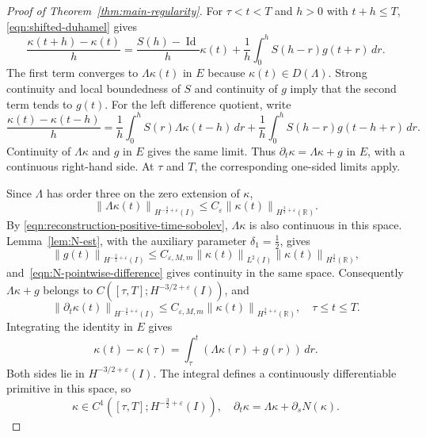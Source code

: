 \documentclass[11pt,reqno]{amsart}
\theoremstyle{plain}
\theoremstyle{definition}
\numberwithin{equation}{section}
\DeclareMathOperator{\Id}{Id}
\newcommand{\paren}[1]{\left(#1\right)}
\newcommand{\p}{\partial}
\newcommand{\norm}[1]{\left\lVert #1 \right\rVert}
\newcommand{\R}{\mathbb{R}}
\newcommand{\hi}[1]{H^{#1}(I)}
\newcommand{\hr}[1]{H^{#1}(\R)}
\begin{document}
\begin{proof}[Proof of Theorem~\ref{thm:main-regularity}]
For $\tau<t<T$ and $h>0$ with $t+h\le T$, \eqref{eqn:shifted-duhamel} gives
\begin{equation}\label{eqn:kappa-time-right-quotient}
    \frac{\kappa(t+h)-\kappa(t)}{h}
    =
    \frac{S(h)-\Id}{h}\kappa(t)
    +\frac1h\int_0^h S(h-r)g(t+r)\,dr.
\end{equation}
The first term converges to $\Lambda\kappa(t)$ in $E$ because
$\kappa(t)\in D(\Lambda)$. Strong continuity and local boundedness of
$S$ and continuity of $g$ imply that the second term tends to $g(t)$.
For the left difference quotient, write
\begin{equation}\label{eqn:kappa-time-left-quotient}
    \frac{\kappa(t)-\kappa(t-h)}{h}
    =
    \frac1h\int_0^h S(r)\Lambda\kappa(t-h)\,dr
    +\frac1h\int_0^h S(h-r)g(t-h+r)\,dr.
\end{equation}
Continuity of $\Lambda\kappa$ and $g$ in $E$ gives the same limit.
Thus $\p_t\kappa=\Lambda\kappa+g$ in $E$, with a continuous right-hand
side. At $\tau$ and $T$, the corresponding one-sided limits apply.

Since $\Lambda$ has order three on the zero extension of $\kappa$,
\begin{equation*}
    \norm{\Lambda\kappa(t)}_{\hi{-\frac32+\varepsilon}}
    \le C_\varepsilon
        \norm{\kappa(t)}_{\hr{\frac32+\varepsilon}}.
\end{equation*}
By \eqref{eqn:reconstruction-positive-time-sobolev}, $\Lambda\kappa$ is
also continuous in this space. Lemma~\ref{lem:N-est}, with
the auxiliary parameter $\delta_1=\frac12$, gives
\begin{equation*}
    \norm{g(t)}_{\hi{-\frac32+\varepsilon}}
    \le C_{\varepsilon,M,m}\norm{\kappa(t)}_{L^2(I)}
        \norm{\kappa(t)}_{\hr{\frac32}},
\end{equation*}
and~\eqref{eqn:N-pointwise-difference} gives continuity in the same space.
Consequently $\Lambda\kappa+g$ belongs to
$C([\tau,T];H^{-3/2+\varepsilon}(I))$, and
\begin{equation}\label{eqn:kappa-time-est}
    \norm{\p_t\kappa(t)}_{\hi{-\frac32+\varepsilon}}
    \le C_{\varepsilon,M,m}
        \norm{\kappa(t)}_{\hr{\frac32+\varepsilon}},
    \quad \tau\le t\le T.
\end{equation}
Integrating the identity in $E$ gives
\begin{equation}\label{eqn:kappa-time-integral}
    \kappa(t)-\kappa(\tau)
    =\int_\tau^t\paren{\Lambda\kappa(r)+g(r)}\,dr.
\end{equation}
Both sides lie in $H^{-3/2+\varepsilon}(I)$. The integral defines a
continuously differentiable primitive in this space, so
\begin{equation}\label{eqn:kappa-time-regularity}
    \kappa\in C^1\paren{[\tau,T];\hi{-\frac32+\varepsilon}},
    \quad
    \p_t\kappa=\Lambda\kappa+\p_sN(\kappa).
\end{equation}


\end{proof}
\end{document}
